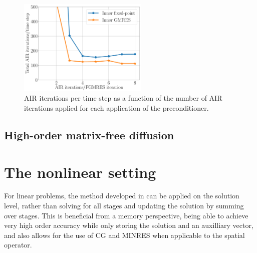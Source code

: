 \documentclass[review]{siamart}
\begin{document}
\begin{figure}[h!]
\centering
\includegraphics[width = 0.55\textwidth]{./figures/dg_advdiff_o2_1e-2.pdf}
\caption{AIR iterations per time step as a function of the number of
AIR iterations applied for each application of the preconditioner.}
\label{fig:dg_o2}
\end{figure}




\subsection{High-order matrix-free diffusion}








\section{The nonlinear setting}\label{sec:nonlinear}

For linear problems, the method developed in  can be applied on the
solution level, rather than solving for all stages and updating the solution
by summing over stages.
This is beneficial from a memory perspective, being able to achieve very
high order accuracy while only storing the solution and an auxilliary vector, and
also allows for the use of CG and MINRES when applicable to the spatial operator.
\end{document}

